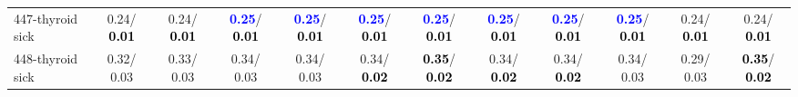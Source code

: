 \begin{table}[h]
\begin{center}
{\begin{tabular}{lc|c|c|c|c|c|c|c|c|c|c}
447-thyroid sick &   0.24/\textcolor{black}{\textbf{  0.01}} &   0.24/\textcolor{black}{\textbf{  0.01}} & \textcolor{blue}{\textbf{  0.25}}/\textcolor{black}{\textbf{  0.01}} & \textcolor{blue}{\textbf{  0.25}}/\textcolor{black}{\textbf{  0.01}} & \textcolor{blue}{\textbf{  0.25}}/\textcolor{black}{\textbf{  0.01}} & \textcolor{blue}{\textbf{  0.25}}/\textcolor{black}{\textbf{  0.01}} & \textcolor{blue}{\textbf{  0.25}}/\textcolor{black}{\textbf{  0.01}} & \textcolor{blue}{\textbf{  0.25}}/\textcolor{black}{\textbf{  0.01}} & \textcolor{blue}{\textbf{  0.25}}/\textcolor{black}{\textbf{  0.01}} &   0.24/\textcolor{black}{\textbf{  0.01}} &   0.24/\textcolor{black}{\textbf{  0.01}} \\
448-thyroid sick &   0.32/  0.03 &   0.33/  0.03 &   0.34/  0.03 &   0.34/  0.03 &   0.34/\textcolor{black}{\textbf{  0.02}} & \textcolor{black}{\textbf{  0.35}}/\textcolor{black}{\textbf{  0.02}} &   0.34/\textcolor{black}{\textbf{  0.02}} &   0.34/\textcolor{black}{\textbf{  0.02}} &   0.34/  0.03 &   0.29/  0.03 & \textcolor{black}{\textbf{  0.35}}/\textcolor{black}{\textbf{  0.02}} \\\end{tabular}}\label{stratsALCKappa13Allalla}
\end{center}
\end{table}
\clearpage
